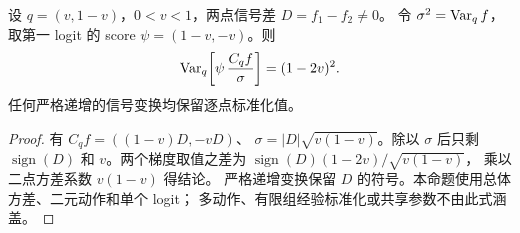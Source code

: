 \begin{proposition}[二元总体标准化消去信号形状]
\label{prop:binary-standardization}
设 $q=(v,1-v)$，$0<v<1$，两点信号差 $D=f_1-f_2\ne0$。
令 $\sigma^2=\operatorname{Var}_qf$，取第一 logit 的 score
$\psi=(1-v,-v)$。则
\begin{equation}
\operatorname{Var}_q\!\left[\psi\,\frac{C_qf}{\sigma}\right]=(1-2v)^2.
\end{equation}
任何严格递增的信号变换均保留逐点标准化值。
\end{proposition}
\begin{proof}
有 $C_qf=((1-v)D,-vD)$、
$\sigma=|D|\sqrt{v(1-v)}$。除以 $\sigma$ 后只剩
$\operatorname{sign}(D)$ 和 $v$。两个梯度取值之差为
$\operatorname{sign}(D)(1-2v)/\sqrt{v(1-v)}$，
乘以二点方差系数 $v(1-v)$ 得结论。
严格递增变换保留 $D$ 的符号。本命题使用总体方差、二元动作和单个 logit；
多动作、有限组经验标准化或共享参数不由此式涵盖。
\end{proof}
